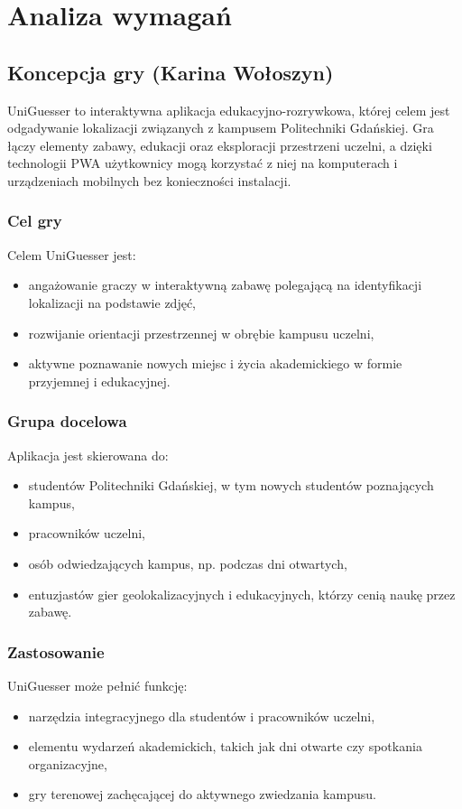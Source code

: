 \chapter{Analiza wymagań}
\label{chap:algs}

\section{Koncepcja gry (Karina Wołoszyn) }

UniGuesser to interaktywna aplikacja edukacyjno-rozrywkowa, której celem jest odgadywanie lokalizacji związanych z kampusem Politechniki Gdańskiej. Gra łączy elementy zabawy, edukacji oraz eksploracji przestrzeni uczelni, a dzięki technologii PWA użytkownicy mogą korzystać z niej na komputerach i urządzeniach mobilnych bez konieczności instalacji.

\subsection{Cel gry}
Celem UniGuesser jest:
\begin{itemize}
    \item angażowanie graczy w interaktywną zabawę polegającą na identyfikacji lokalizacji na podstawie zdjęć,
    \item rozwijanie orientacji przestrzennej w obrębie kampusu uczelni,
    \item aktywne poznawanie nowych miejsc i życia akademickiego w formie przyjemnej i edukacyjnej.
\end{itemize}

\subsection{Grupa docelowa}
Aplikacja jest skierowana do:
\begin{itemize}
    \item studentów Politechniki Gdańskiej, w tym nowych studentów poznających kampus,
    \item pracowników uczelni,
    \item osób odwiedzających kampus, np. podczas dni otwartych,
    \item entuzjastów gier geolokalizacyjnych i edukacyjnych, którzy cenią naukę przez zabawę.
\end{itemize}

\subsection{Zastosowanie}
UniGuesser może pełnić funkcję:
\begin{itemize}
    \item narzędzia integracyjnego dla studentów i pracowników uczelni,
    \item elementu wydarzeń akademickich, takich jak dni otwarte czy spotkania organizacyjne,
    \item gry terenowej zachęcającej do aktywnego zwiedzania kampusu.
\end{itemize}

